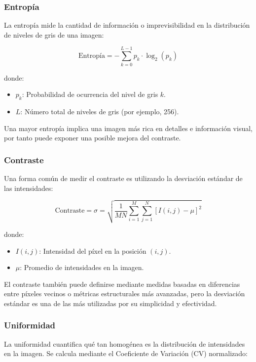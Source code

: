 \documentclass[sigchi]{acmart}
\begin{document}
\subsubsection{\textbf{Entropía}}
La entropía mide la cantidad de información o imprevisibilidad en la distribución de niveles de gris de una imagen:

\begin{equation}
	\text{Entropía} = - \sum_{k=0}^{L-1} p_k \cdot \log_2(p_k)
\end{equation}

donde:
\begin{itemize}
	\item $p_k$: Probabilidad de ocurrencia del nivel de gris $k$.
	\item $L$: Número total de niveles de gris (por ejemplo, 256).
\end{itemize}

Una mayor entropía implica una imagen más rica en detalles e información visual, por tanto
puede exponer una posible mejora del contraste.

\subsubsection{\textbf{Contraste}}
Una forma común de medir el contraste es utilizando la desviación estándar de las intensidades:

\begin{equation}
	\text{Contraste} = \sigma = \sqrt{\frac{1}{MN} \sum_{i=1}^{M} \sum_{j=1}^{N} \left[ I(i,j) - \mu \right]^2}
\end{equation}

donde:
\begin{itemize}
	\item $I(i,j)$: Intensidad del píxel en la posición $(i,j)$.
	\item $\mu$: Promedio de intensidades en la imagen.
\end{itemize}

El contraste también puede definirse mediante medidas basadas en diferencias entre píxeles
vecinos o métricas estructurales más avanzadas, pero la desviación estándar es una de las más
utilizadas por su simplicidad y efectividad.

\subsubsection{\textbf{Uniformidad}}
La uniformidad cuantifica qué tan homogénea es la distribución de intensidades en la imagen. Se
calcula mediante el Coeficiente de Variación (CV) normalizado:
\end{document}
